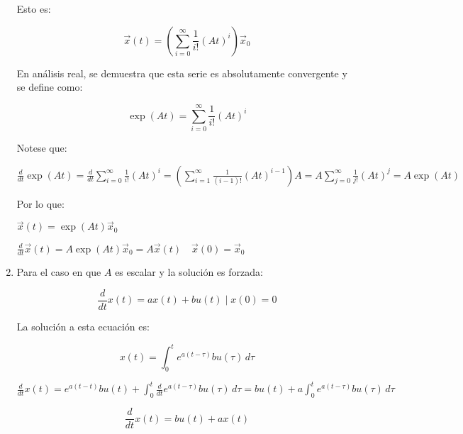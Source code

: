 \begin{enumerate}
Esto es:

\begin{equation}
\vec{x}(t) = \left( \sum\limits_{i = 0}^{\infty} \frac{1}{i!} (A t)^i \right) \vec{x}_0 \nonumber
\end{equation}

En análisis real, se demuestra que esta serie es absolutamente convergente y se define como:

\begin{equation}
\exp{(At)} = \sum\limits_{i = 0}^{\infty} \frac{1}{i!} (A t)^i
\end{equation}

Notese que:

\begin{math}
\frac{d}{dt} \exp{(At)} = \frac{d}{dt} \sum\limits_{i=0}^{\infty} \frac{1}{i!} (At)^i = \left( \sum\limits_{i=1}^{\infty} \frac{1}{(i-1)!} (At)^{i-1} \right) A = A \sum\limits_{j=0}^{\infty} \frac{1}{j!} (At)^j = A \exp{(At)}
\end{math}

Por lo que:

\begin{math}
\vec{x}(t) = \exp{(At)} \vec{x}_0
\end{math}

\begin{math}
\frac{d}{dt} \vec{x}(t) = A \exp{(At)} \vec{x}_0 = A \vec{x}(t) \quad \vec{x}(0) = \vec{x}_0
\end{math}

\item
Para el caso en que $A$ es escalar y la solución es forzada:

\begin{equation}
\frac{d}{dt} x(t) = a x(t) + b u(t) \mid x(0) = 0
\end{equation}

La solución a esta ecuación es:

\begin{equation}
x(t) = \int_0^t e^{a(t-\tau)} b u(\tau) \, d \tau
\end{equation}

\begin{math}
\frac{d}{dt} x(t) = e^{a(t-t)} b u(t) + \int_0^t \frac{d}{dt} e^{a(t-\tau)} b u(\tau) \, d \tau = b u(t) + a \int_0^t e^{a(t-\tau)} b u(\tau) \, d \tau
\end{math}

\begin{equation}
\frac{d}{dt} x(t) = b u(t) + a x(t)
\end{equation}


\end{enumerate}
